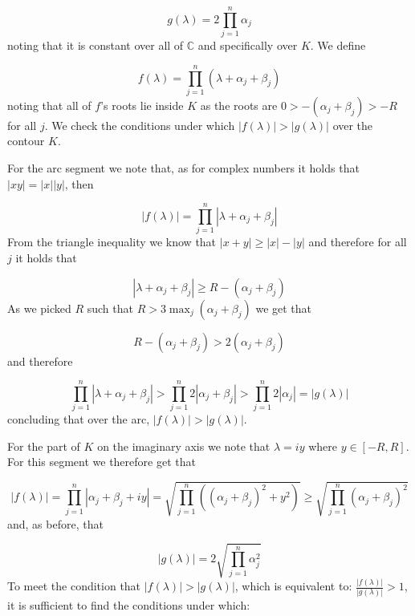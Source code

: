   \begin{equation*}
      g(\lambda)=2\prod_{j=1}^n\alpha_j
  \end{equation*}
  noting that it is constant over all of $\mathbb{C}$ and specifically over $K$.
  We define

  \begin{equation*}
      f(\lambda)=\prod_{j=1}^n(\lambda+\alpha_j+\beta_j)
  \end{equation*}
  noting that all of $f$'s roots lie inside $K$ as the roots are $0>-(\alpha_j+\beta_j)>-R$ for all $j$.
  We check the conditions under which $|f(\lambda)|>|g(\lambda)|$ over the contour $K$.

  For the arc segment we note that, as for complex numbers it holds that $|xy|=|x||y|$, then

  \begin{equation*}
      |f(\lambda)|=\prod_{j=1}^n|\lambda+\alpha_j+\beta_j|
  \end{equation*}
  From the triangle inequality we know that $|x+y| \geq |x|-|y|$ and therefore for all $j$ it holds that

  \begin{equation*}
      |\lambda+\alpha_j+\beta_j| \geq R-(\alpha_j+\beta_j)
  \end{equation*}
  As we picked $R$ such that $R>3\max_j(\alpha_j+\beta_j)$ we get that 

  \begin{equation*}
      R-(\alpha_j+\beta_j)>2(\alpha_j+\beta_j)
  \end{equation*}
  and therefore 

  \begin{equation*}
      \prod_{j=1}^n|\lambda+\alpha_j+\beta_j|>\prod_{j=1}^n2|\alpha_j+\beta_j|>\prod_{j=1}^n2|\alpha_j| = |g(\lambda)|
  \end{equation*}
  concluding that over the arc, $|f(\lambda)|>|g(\lambda)|$.

  For the part of $K$ on the imaginary axis we note that $\lambda=iy$ where $y\in[-R,R]$.
For this segment we therefore get that

\begin{equation*}
    |f(\lambda)|=\prod_{j=1}^n|\alpha_j+\beta_j+iy|=\sqrt{\prod_{j=1}^n((\alpha_j+\beta_j)^2+y^2)} \geq \sqrt{\prod_{j=1}^n(\alpha_j+\beta_j)^2}
 \end{equation*} 
 and, as before, that

 \begin{equation*}
     |g(\lambda)|=2\sqrt{\prod_{j=1}^n\alpha_j^2}
 \end{equation*}
 To meet the condition that $|f(\lambda)|>|g(\lambda)|$, which is equivalent to: $\frac{|f(\lambda)|}{|g(\lambda)|}>1$, it is sufficient to find the conditions under which:

